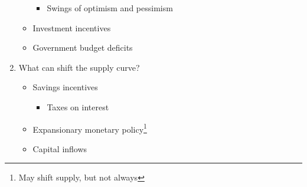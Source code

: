 \documentclass[12pt]{article}
\begin{document}
\begin{enumerate}
\begin{itemize}
\begin{itemize}
          \item Swings of optimism and pessimism

        \end{itemize}

      \item Investment incentives

      \item Government budget deficits

    \end{itemize}

  \item What can shift the supply curve?

    \begin{itemize}

      \item Savings incentives

        \begin{itemize}

          \item Taxes on interest

        \end{itemize}

      \item Expansionary monetary policy\footnote{May shift supply, but not always}

      \item Capital inflows

    \end{itemize}

\end{enumerate}
\end{document}
